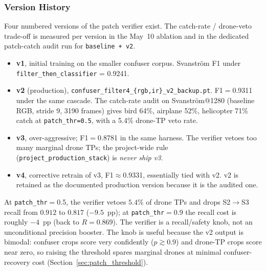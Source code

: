 \subsubsection{Version History}

Four numbered versions of the patch verifier exist. The catch-rate / drone-veto trade-off is measured per version in the May~10 ablation and in the dedicated patch-catch audit run for \texttt{baseline + v2}.

\begin{itemize}
    \item \textbf{v1}, initial training on the smaller confuser corpus. Svanstr\"om F1 under \texttt{filter\_then\_classifier} = 0.9241.
    \item \textbf{v2} (production), \texttt{confuser\_filter4\_\{rgb,ir\}\_v2\_backup.pt}. F1$=$0.9311 under the same cascade. The catch-rate audit on Svanstr\"om@1280 (baseline RGB, stride 9, 3190 frames) gives bird 64\%, airplane 52\%, helicopter 71\% catch at \texttt{patch\_thr=0.5}, with a 5.4\% drone-TP veto rate.
    \item \textbf{v3}, over-aggressive; F1$=$0.8781 in the same harness. The verifier vetoes too many marginal drone TPs; the project-wide rule (\texttt{project\_production\_stack}) is \emph{never ship v3}.
    \item \textbf{v4}, corrective retrain of v3, F1$\approx$0.9331, essentially tied with v2. v2 is retained as the documented production version because it is the audited one.
\end{itemize}

At \texttt{patch\_thr}$=$0.5, the verifier vetoes $5.4\%$ of drone TPs and drops S2$\to$S3 recall from $0.912$ to $0.817$ ($-9.5$~pp); at \texttt{patch\_thr}$=$0.9 the recall cost is roughly $-4$~pp (back to $R=0.869$). The verifier is a recall/safety knob, not an unconditional precision booster. The knob is useful because the v2 output is bimodal: confuser crops score very confidently ($p \gtrsim 0.9$) and drone-TP crops score near zero, so raising the threshold spares marginal drones at minimal confuser-recovery cost (Section~\ref{sec:patch_threshold}).


